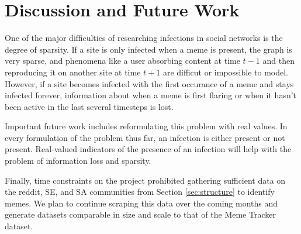 \documentclass{article} %
\begin{document}
\section{Discussion and Future Work}
\label{sec:conclusions}

One of the major difficulties of researching infections in social networks is the degree of sparsity. If a site is only infected when a meme is present, the graph is very sparse, and phenomena like a user absorbing content at time $t-1$ and then reproducing it on another site at time $t+1$ are difficut or impossible to model. However, if a site becomes infected with the first occurance of a meme and stays infected forever, information about when a meme is first flaring or when it hasn't been active in the last several timesteps is lost.

Important future work includes reformulating this problem with real values. In every formulation of the problem thus far, an infection is either present or not present. Real-valued indicators of the presence of an infection will help with the problem of information loss and sparsity.

Finally, time constraints on the project prohibited gathering sufficient data on the reddit, SE, and SA communities from Section \ref{sec:structure} to identify memes. We plan to continue scraping this data over the coming months and generate datasets comparable in size and scale to that of the Meme Tracker dataset.

{}
\label{refs}

\end{document}
